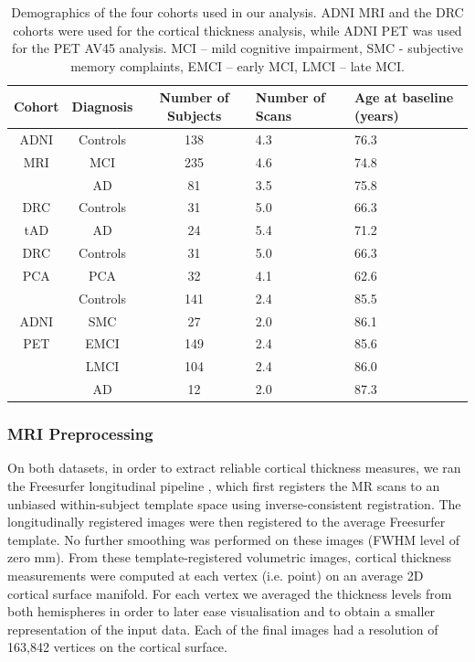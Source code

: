 \begin{table}
  \centering
  \begin{tabular}{c | c | c | C{3.5cm} | C{3.5cm} } 
  \textbf{Cohort} & \textbf{Diagnosis} & \textbf{Number of Subjects} & \textbf{Number of Scans} & \textbf{Age at baseline (years)}\\
  \hline
  ADNI & Controls & 138 & 4.3 & 76.3\\ 
  MRI & MCI & 235 & 4.6 & 74.8\\ 
  & AD & 81 & 3.5 & 75.8\\ 
  \hline
  DRC & Controls & 31 & 5.0 & 66.3\\ 
  tAD & AD & 24 & 5.4 & 71.2\\ 
  \hline
  DRC & Controls & 31 & 5.0 & 66.3\\ 
  PCA & PCA & 32 & 4.1 & 62.6\\ 
  \hline
  & Controls & 141 & 2.4 & 85.5\\ 
  ADNI & SMC & 27 & 2.0 & 86.1\\ 
  PET & EMCI & 149 & 2.4 & 85.6\\
  & LMCI & 104 & 2.4 & 86.0\\
  & AD & 12 & 2.0 & 87.3\\
  \end{tabular}
  \caption[Demographics of the four cohorts from ADNI and DRC]{Demographics of the four cohorts used in our analysis. ADNI MRI and the DRC cohorts were used for the cortical thickness analysis, while ADNI PET was used for the PET AV45 analysis. MCI -- mild cognitive impairment, SMC - subjective memory complaints, EMCI -- early MCI, LMCI -- late MCI.}
 \label{tab:divePcaDemogr}
\end{table}


\subsubsection{MRI Preprocessing}

On both datasets, in order to extract reliable cortical thickness measures, we ran the Freesurfer longitudinal pipeline \cite{reuter2012within}, which first registers the MR scans to an unbiased within-subject template space using inverse-consistent registration. The longitudinally registered images were then registered to the average Freesurfer template. No further smoothing was performed on these images (FWHM level of zero mm). From these template-registered volumetric images, cortical thickness measurements were computed at each vertex (i.e. point) on an average 2D cortical surface manifold. For each vertex we averaged the thickness levels from both hemispheres in order to later ease visualisation and to obtain a smaller representation of the input data. Each of the final images had a resolution of 163,842 vertices on the cortical surface. 

